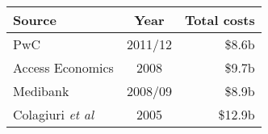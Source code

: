 \bgroup
\def\arraystretch{1.2}
\begin{tabular}{lcr}
\toprule
\textbf{Source} & \textbf{Year} & \textbf{Total costs} \\ 
\midrule
PwC & 2011/12 & \$8.6b \\
Access Economics & 2008 & \$9.7b \\
Medibank & 2008/09 & \$8.9b \\
Colagiuri \emph{et al } & 2005 & \$12.9b \\
\bottomrule
\end{tabular}
\egroup
